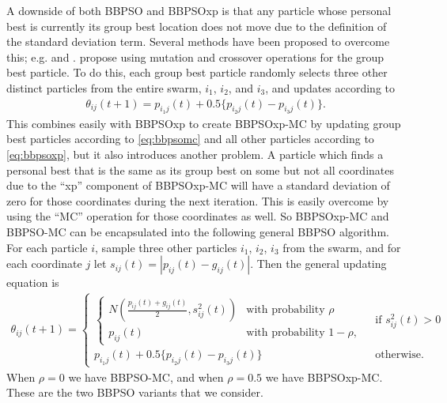 \documentclass[12pt]{article}
\begin{document}
A downside of both BBPSO and BBPSOxp is that any particle whose personal best is currently its group best location does not move due to the definition of the standard deviation term. Several methods have been proposed to overcome this; e.g. \citet{hsieh2010modified} and \citet{zhang2011novel}. \citet{zhang2011novel} propose using mutation and crossover operations for the group best particle. To do this, each group best particle randomly selects three other distinct particles from the entire swarm, $i_1$, $i_2$, and $i_3$, and updates according to
\begin{align}\label{eq:bbpsomc}
\theta_{ij}(t+1) = p_{i_1j}(t) + 0.5\{p_{i_2j}(t) - p_{i_3j}(t)\}.
\end{align}
This combines easily with BBPSOxp to create BBPSOxp-MC by updating group best particles according to \eqref{eq:bbpsomc} and all other particles according to \eqref{eq:bbpsoxp}, but it also introduces another problem. A particle which finds a personal best that is the same as its group best on some but not all coordinates due to the ``xp'' component of BBPSOxp-MC will have a standard deviation of zero for those coordinates during the next iteration. This is easily overcome by using the ``MC'' operation for those coordinates as well. So BBPSOxp-MC and BBPSO-MC can be encapsulated into the following general BBPSO algorithm. For each particle $i$, sample three other particles $i_1$, $i_2$, $i_3$ from the swarm, and for each coordinate $j$ let $s_{ij}(t) = |p_{ij}(t) - g_{ij}(t)|$. Then the general updating equation is
\begin{align}\label{eq:bbpsoall}
\theta_{ij}(t+1) = 
  \begin{cases} 
    \begin{cases} N\left(\frac{p_{ij}(t) + g_{ij}(t)}{2}, s^2_{ij}(t)\right) & \mbox{with probability } \rho\\
      p_{ij}(t) & \mbox{with probability } 1 - \rho,
    \end{cases}
    & \mbox{ if } s^2_{ij}(t) > 0\\
    p_{i_1j}(t) + 0.5\{p_{i_2j}(t) - p_{i_3j}(t)\} & \mbox{ otherwise.}
  \end{cases}
\end{align}
When $\rho = 0$ we have BBPSO-MC, and when $\rho = 0.5$ we have BBPSOxp-MC. These are the two BBPSO variants that we consider.
\end{document}
